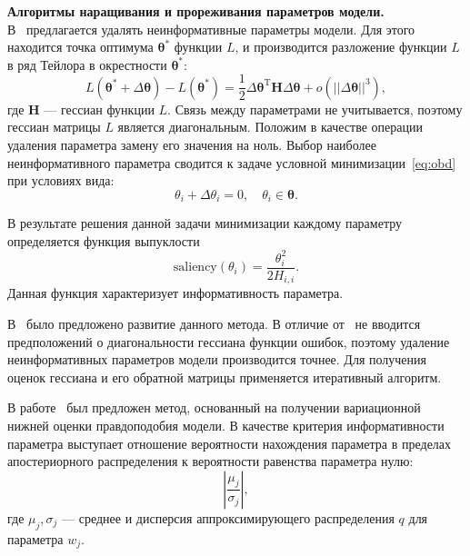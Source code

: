 \textbf{Алгоритмы наращивания и прореживания параметров модели.}\\
В~\cite{obd} предлагается удалять неинформативные параметры модели.
Для этого находится точка оптимума $\boldsymbol{\theta}^{*}$ функции $L$, и производится разложение функции $L$ в ряд Тейлора в окрестности $\boldsymbol{\theta}^{*}$:
\begin{equation}
\label{eq:obd}
    L(\boldsymbol{\theta}^{*} + \Delta\boldsymbol{\theta})  - L(\boldsymbol{\theta}^{*}) = \frac{1}{2} \Delta\boldsymbol{\theta}^{\text{T}}\mathbf{H}\Delta\boldsymbol{\theta} + o(||\Delta\boldsymbol{\theta}||^{3}),
\end{equation}
где $\mathbf{H}$ --- гессиан функции $L$. Связь между параметрами не учитывается, поэтому гессиан матрицы $L$ является диагональным.
Положим в качестве операции удаления параметра замену его значения на ноль. Выбор наиболее неинформативного параметра сводится к задаче условной минимизации~\eqref{eq:obd} при условиях вида:
\[
    {\theta}_i + \Delta{\theta}_i = 0, \quad  {\theta}_i \in \boldsymbol{\theta}.
\] 

В результате решения данной задачи минимизации каждому параметру определяется функция выпуклости
\[
    \text{saliency}({\theta}_i) = \frac{{\theta}^2_i}{2H_{i,i}}.
\]
Данная функция характеризует информативность параметра.

В~\cite{obs} было предложено развитие данного метода. В отличие от~\cite{obd} не вводится предположений о диагональности гессиана функции ошибок, поэтому удаление неинформативных параметров модели производится точнее. Для получения оценок гессиана и его обратной матрицы применяется итеративный алгоритм.

В работе~\cite{nips} был предложен метод, основанный на получении вариационной нижней оценки правдоподобия модели. В качестве критерия информативности параметра выступает отношение вероятности нахождения параметра в пределах апостериорного распределения к вероятности равенства параметра нулю:
\[
    \left|\frac{\mu_j}{\sigma_j}\right|,  
\]
где $\mu_j, \sigma_j$ --- среднее и дисперсия аппроксимирующего распределения $q$ для параметра $w_j$.


